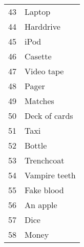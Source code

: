 \documentclass[11pt,a4paper,twocolumn]{article}
\begin{document}
\begin{supertabular}{cl}
    43 &Laptop\\
    44 &Harddrive\\
    45 &iPod\\
    46 &Casette\\
    47 &Video tape\\
    48 &Pager\\
    49 &Matches\\
    50 &Deck of cards\\
    51 &Taxi\\
    52 &Bottle\\
    53 &Trenchcoat\\
    54 &Vampire teeth\\
    55 &Fake blood\\
    56 &An apple\\
    57 &Dice\\
    58 &Money\\
\end{supertabular}
\end{document}
